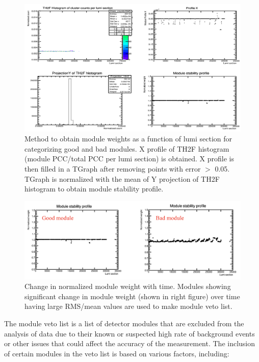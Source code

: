 \begin{figure}[!htp]
\centering
\includegraphics[width=1\textwidth]{ashish_thesis/Module_weight.png}
\caption[Steps involved to obtain module weights]{%
   Method to obtain module weights as a function of lumi section for categorizing good and bad modules. X profile of TH2F histogram (module PCC/total PCC per lumi section) is obtained. X profile is then filled in a TGraph after removing points with error $>$ 0.05. TGraph is normalized with the mean of Y projection of TH2F histogram to obtain module stability profile.
}
\label{fig:mod_weight}
\end{figure}


\begin{figure}[!htp]
\centering
\includegraphics[width=1\textwidth]{ashish_thesis/good_bad_modules.png}
\caption[Good and bad module weights]{%
   Change in normalized module weight with time. Modules showing significant change in module weight (shown in right figure) over time having large RMS/mean values are used to make module veto list.
}
\label{fig:goodbadmodules}
\end{figure}


\newpage
The module veto list is a list of detector modules that are excluded from the analysis of data due to their known or suspected high rate of background events or other issues that could affect the accuracy of the measurement. The inclusion of certain modules in the veto list is based on various factors, including:

